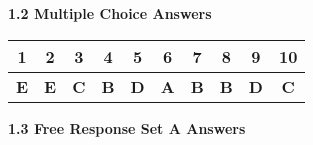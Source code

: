 \textbf{\large{1.2 Multiple Choice Answers}} \par

{\renewcommand{\arraystretch}{1.4} %
\begin{tabular}[l]{|c|c|c|c|c|c|c|c|c|c|}
    \hline
    1 & 2 & 3 & 4 & 5 & 6 & 7 & 8 & 9 & 10 \\ \hline
    \textbf{E} & \textbf{E} & \textbf{C} & \textbf{B} & \textbf{D} & \textbf{A} & \textbf{B} & \textbf{B} & \textbf{D} & \textbf{C}\\
    \hline
\end{tabular}}

\bigskip

\textbf{\large{1.3 Free Response Set A Answers}} \par

